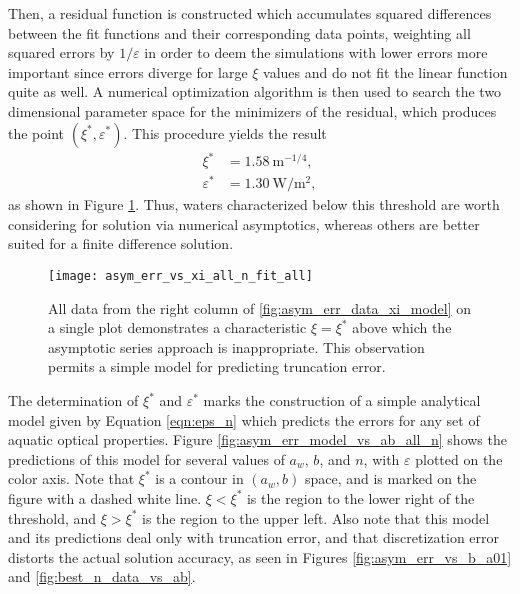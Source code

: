Then, a residual function is constructed which accumulates squared differences between the fit functions and their corresponding data points, weighting all squared errors by $1/\varepsilon$ in order to deem the simulations with lower errors more important since errors diverge for large $\xi$ values and do not fit the linear function quite as well.
A numerical optimization algorithm is then used to search the two dimensional parameter space for the minimizers of the residual, which produces the point $(\xi^*, \varepsilon^*)$.
This procedure yields the result
\begin{align}
  \xi^* &= \SI{1.58}{\m^{-1/4}}, \\
  \varepsilon^* &= \SI{1.30}{\W\per\m\squared},
\end{align}
as shown in Figure \ref{fig:asym_err_vs_xi_all_n_fit_all}.
Thus, waters characterized below this threshold are worth considering for solution via numerical asymptotics, whereas others are better suited for a finite difference solution.

\begin{figure}[H]
  \centering
  \texttt{[image: asym\_err\_vs\_xi\_all\_n\_fit\_all]}
  \caption{All data from the right column of \ref{fig:asym_err_data_xi_model} on a single plot demonstrates a characteristic $\xi=\xi^*$ above which the asymptotic series approach is inappropriate. This observation permits a simple model for predicting truncation error.}
  \label{fig:asym_err_vs_xi_all_n_fit_all}
\end{figure}

The determination of $\xi^*$ and $\varepsilon^*$ marks the construction of a simple analytical model given by Equation \eqref{eqn:eps_n} which predicts the errors for any set of aquatic optical properties.
Figure \ref{fig:asym_err_model_vs_ab_all_n} shows the predictions of this model for several values of $a_w$, $b$, and $n$, with $\varepsilon$ plotted on the color axis.
Note that $\xi^*$ is a contour in $(a_w, b)$ space, and is marked on the figure with a dashed white line.
$\xi<\xi^*$ is the region to the lower right of the threshold, and $\xi>\xi^*$ is the region to the upper left.
Also note that this model and its predictions deal only with truncation error, and that discretization error distorts the actual solution accuracy, as seen in Figures \ref{fig:asym_err_vs_b_a01} and \ref{fig:best_n_data_vs_ab}.


